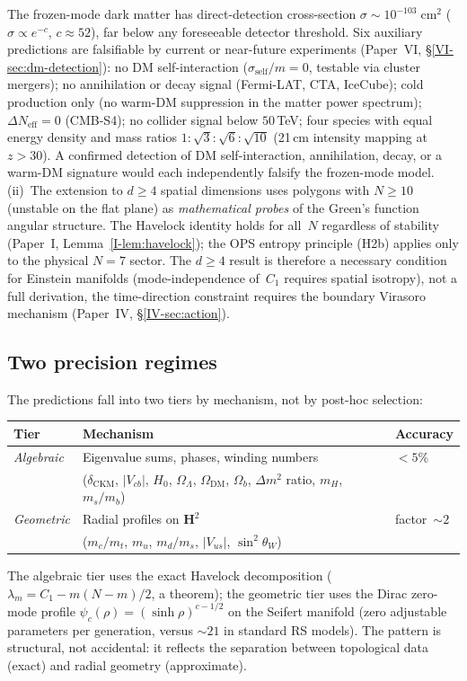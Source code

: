 The frozen-mode dark matter has direct-detection
cross-section $\sigma \sim 10^{-103}\;\mathrm{cm}^2$
($\sigma \propto e^{-c}$, $c \approx 52$),
far below any foreseeable detector threshold.
Six auxiliary predictions are falsifiable by
current or near-future experiments
(Paper~VI, \S\ref*{VI-sec:dm-detection}):
no DM self-interaction ($\sigma_{\mathrm{self}}/m = 0$,
testable via cluster mergers);
no annihilation or decay signal
(Fermi-LAT, CTA, IceCube);
cold production only (no warm-DM suppression
in the matter power spectrum);
$\Delta N_{\mathrm{eff}} = 0$
(CMB-S4);
no collider signal below $50$\,TeV;
four species with equal energy density
and mass ratios $1:\!\sqrt{3}:\!\sqrt{6}:\!\sqrt{10}$
(21\,cm intensity mapping at $z > 30$).
A confirmed detection of DM self-interaction,
annihilation, decay, or a warm-DM signature
would each independently falsify the frozen-mode model.
(ii)~The extension to $d \ge 4$ spatial dimensions
uses polygons with $N \ge 10$ (unstable on the flat plane)
as \emph{mathematical probes} of the Green's function
angular structure.
The Havelock identity holds for all~$N$ regardless of
stability (Paper~I, Lemma~\ref*{I-lem:havelock});
the OPS entropy principle (H2b) applies only to the physical
$N = 7$ sector.
The $d \ge 4$ result is therefore a necessary condition
for Einstein manifolds (mode-independence of~$C_1$
requires spatial isotropy), not a full derivation, the
time-direction constraint requires the boundary Virasoro
mechanism (Paper~IV, \S\ref*{IV-sec:action}).

\subsection{Two precision regimes}
The predictions fall into two tiers by mechanism,
not by post-hoc selection:
\begin{center}
\small
\begin{tabular}{lll}
\toprule
Tier & Mechanism & Accuracy \\
\midrule
\emph{Algebraic} &
  Eigenvalue sums, phases, winding numbers &
  $< 5\%$ \\
& ($\delta_{\mathrm{CKM}}$, $|V_{cb}|$, $H_0$,
  $\Omega_\Lambda$, $\Omega_{\mathrm{DM}}$, $\Omega_b$,
  $\Delta m^2$ ratio, $m_H$, $m_s/m_b$) & \\[3pt]
\emph{Geometric} &
  Radial profiles on $\mathbf{H}^2$ &
  factor~${\sim}2$ \\
& ($m_c/m_t$, $m_u$, $m_d/m_s$,
  $|V_{us}|$, $\sin^2\theta_W$) & \\
\bottomrule
\end{tabular}
\end{center}
\noindent
The algebraic tier uses the exact Havelock decomposition
($\lambda_m = C_1 - m(N{-}m)/2$, a theorem);
the geometric tier uses the Dirac zero-mode profile
$\psi_c(\rho) = (\sinh\rho)^{c-1/2}$ on the Seifert manifold
(zero adjustable parameters per generation, versus
${\sim}\!21$ in standard RS models).
The pattern is structural, not accidental: it reflects
the separation between topological data (exact)
and radial geometry (approximate).

